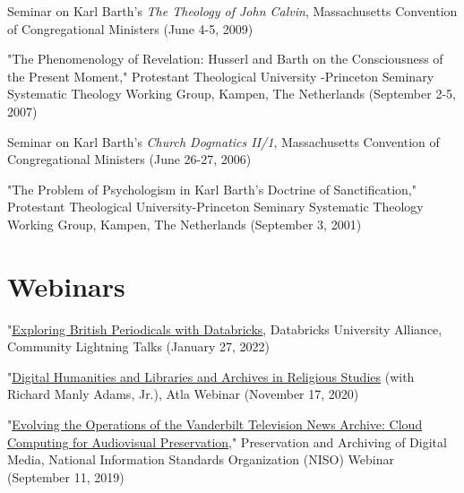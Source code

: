 \documentclass[]{res} %
\begin{document}
\begin{resume}
\begin{hangparas}{.25in}{1}Seminar on Karl Barth’s \textit{The Theology of John Calvin}, Massachusetts Convention of Congregational Ministers (June 4-5, 2009)\end{hangparas}

\begin{hangparas}{.25in}{1}"The Phenomenology of Revelation: Husserl and Barth on the Consciousness of the Present Moment," Protestant Theological University -Princeton Seminary Systematic Theology Working Group, Kampen, The Netherlands (September 2-5, 2007)\end{hangparas}

\begin{hangparas}{.25in}{1}Seminar on Karl Barth’s \textit{Church Dogmatics II/1}, Massachusetts Convention of Congregational Ministers (June 26-27, 2006)\end{hangparas}

\begin{hangparas}{.25in}{1}"The Problem of Psychologism in Karl Barth’s Doctrine of Sanctification," Protestant Theological University-Princeton Seminary Systematic Theology Working Group, Kampen, The Netherlands (September 3, 2001)\end{hangparas}

\section{Webinars}

\begin{hangparas}{.25in}{1}"\href{https://www.youtube.com/watch?v=blOVRKSrsO0}{Exploring British Periodicals with Databricks}, Databricks University Alliance, Community Lightning Talks (January 27, 2022)\end{hangparas}

\begin{hangparas}{.25in}{1}"\href{https://www.atla.com/webinar/digital-humanities-and-libraries-and-archives-in-religious-studies/}{Digital Humanities and Libraries and Archives in Religious Studies} (with Richard Manly Adams, Jr.), Atla Webinar (November 17, 2020)\end{hangparas}

\begin{hangparas}{.25in}{1}"\href{https://www.niso.org/events/2019/09/preservation-and-archiving-digital-media}{Evolving the Operations of the Vanderbilt Television News Archive: Cloud Computing for Audiovisual Preservation}," Preservation and Archiving of Digital Media, National Information Standards Organization (NISO) Webinar (September 11, 2019)\end{hangparas}


\end{resume}
\end{document}
